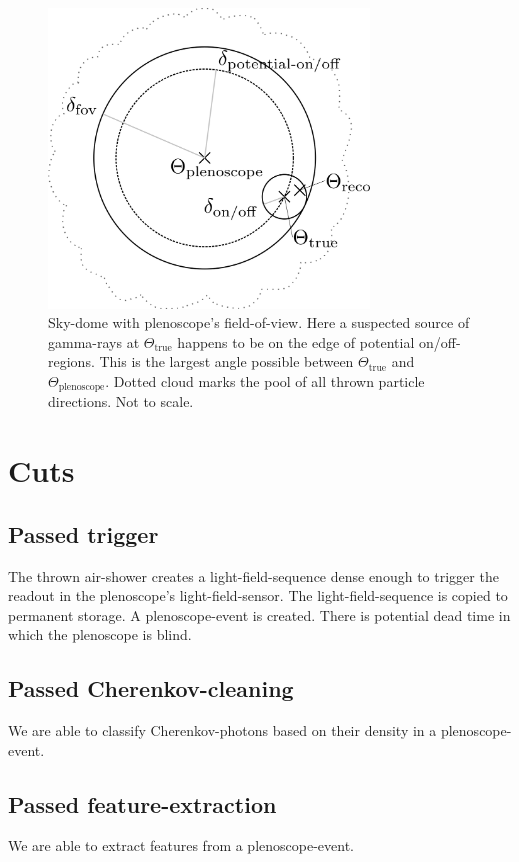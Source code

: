 \documentclass[a4paper,12pt,oneside]{article}
\begin{document}
\begin{figure}
\includegraphics[width=0.76\textwidth]{field_of_view.png}
\caption{
Sky-dome with plenoscope's field-of-view.
%
Here a suspected source of gamma-rays at $\Theta_\text{true}$ happens to be on the edge of potential on/off-regions.
%
This is the largest angle possible between $\Theta_\text{true}$ and $\Theta_\text{plenoscope}$.
%
Dotted cloud marks the pool of all thrown particle directions.
%
Not to scale.
%
}
\label{FigFieldOfView}
\end{figure}
%
\section{Cuts}
\label{SecCuts}
%
\subsection{Passed trigger}
\label{SecPassedTrigger}
%
The thrown air-shower creates a light-field-sequence dense enough to trigger the readout in the plenoscope's light-field-sensor.
%
The light-field-sequence is copied to permanent storage.
%
A plenoscope-event is created.
%
There is potential dead time in which the plenoscope is blind.
%
\subsection{Passed Cherenkov-cleaning}
\label{SecPassedCherenkovcleaning}
%
We are able to classify Cherenkov-photons based on their density in a plenoscope-event.
%
\subsection{Passed feature-extraction}
\label{SecPassedFeatureExtraction}
%
We are able to extract features from a plenoscope-event.
%
\end{document}
